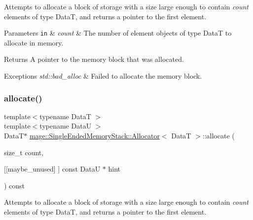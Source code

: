 Attempts to allocate a block of storage with a size large enough to contain {\itshape count} elements of type {\ttfamily DataT}, and returns a pointer to the first element.


\begin{DoxyParams}[1]{Parameters}
\mbox{\tt in}  & {\em count} & The number of element objects of type {\ttfamily DataT} to allocate in memory. \\
\hline
\end{DoxyParams}
\begin{DoxyReturn}{Returns}
A pointer to the memory block that was allocated. 
\end{DoxyReturn}

\begin{DoxyExceptions}{Exceptions}
{\em std\+::bad\+\_\+alloc} & Failed to allocate the memory block. \\
\hline
\end{DoxyExceptions}
\hypertarget{structmage_1_1_single_ended_memory_stack_1_1_allocator_a36d8610c0bd9dec00f7531e469903272}{}\label{structmage_1_1_single_ended_memory_stack_1_1_allocator_a36d8610c0bd9dec00f7531e469903272} 
\subsubsection{\texorpdfstring{allocate()}{allocate()}\hspace{0.1cm}{\footnotesize\ttfamily [2/2]}}
{\footnotesize\ttfamily template$<$typename DataT $>$ \\
template$<$typename DataU $>$ \\
DataT$\ast$ \hyperlink{structmage_1_1_single_ended_memory_stack_1_1_allocator}{mage\+::\+Single\+Ended\+Memory\+Stack\+::\+Allocator}$<$ DataT $>$\+::allocate (\begin{DoxyParamCaption}\item[{size\+\_\+t}]{count,  }\item[{\mbox{[}\mbox{[}maybe\+\_\+unused\mbox{]} \mbox{]} const DataU $\ast$}]{hint }\end{DoxyParamCaption}) const}

Attempts to allocate a block of storage with a size large enough to contain {\itshape count} elements of type {\ttfamily DataT}, and returns a pointer to the first element.


